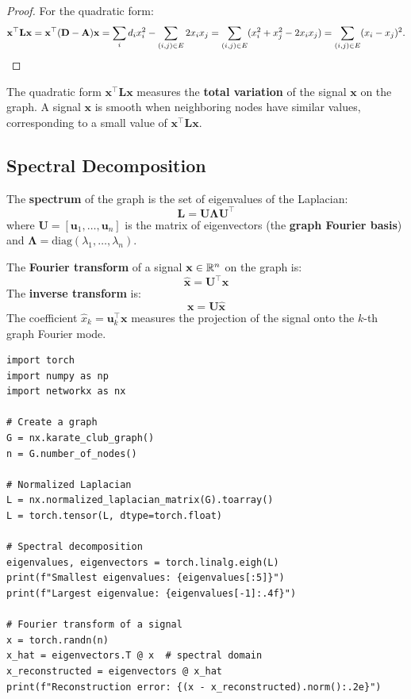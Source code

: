 \begin{proof}
For the quadratic form:
\[
    \mathbf{x}^\top \mathbf{L} \mathbf{x} = \mathbf{x}^\top (\mathbf{D} - \mathbf{A})\mathbf{x}
    = \sum_i d_i x_i^2 - \sum_{(i,j) \in E} 2x_i x_j
    = \sum_{(i,j) \in E} (x_i^2 + x_j^2 - 2x_i x_j)
    = \sum_{(i,j) \in E} (x_i - x_j)^2. \qedhere
\]
\end{proof}

\begin{intuition}[title=\textbf{The Laplacian as a smoothing operator}]
The quadratic form $\mathbf{x}^\top \mathbf{L} \mathbf{x}$ measures the
\textbf{total variation} of the signal $\mathbf{x}$ on the graph. A signal
$\mathbf{x}$ is smooth when neighboring nodes have similar values,
corresponding to a small value of $\mathbf{x}^\top \mathbf{L} \mathbf{x}$.
\end{intuition}

\subsection{Spectral Decomposition}

\begin{definition}
The \textbf{spectrum} of the graph is the set of eigenvalues of the Laplacian:
\[
    \mathbf{L} = \mathbf{U} \boldsymbol{\Lambda} \mathbf{U}^\top
\]
where $\mathbf{U} = [\mathbf{u}_1, \ldots, \mathbf{u}_n]$ is the matrix of
eigenvectors (the \textbf{graph Fourier basis}) and
$\boldsymbol{\Lambda} = \mathrm{diag}(\lambda_1, \ldots, \lambda_n)$.
\end{definition}

\begin{keyformulas}[title=\textbf{Graph Fourier Transform}]
The \textbf{Fourier transform} of a signal $\mathbf{x} \in \mathbb{R}^n$ on the
graph is:
\[
    \hat{\mathbf{x}} = \mathbf{U}^\top \mathbf{x}
\]
The \textbf{inverse transform} is:
\[
    \mathbf{x} = \mathbf{U} \hat{\mathbf{x}}
\]
The coefficient $\hat{x}_k = \mathbf{u}_k^\top \mathbf{x}$ measures the
projection of the signal onto the $k$-th graph Fourier mode.
\end{keyformulas}

\begin{codeblock}[title=\textbf{Spectral decomposition and Fourier transform}]
\begin{verbatim}
import torch
import numpy as np
import networkx as nx

# Create a graph
G = nx.karate_club_graph()
n = G.number_of_nodes()

# Normalized Laplacian
L = nx.normalized_laplacian_matrix(G).toarray()
L = torch.tensor(L, dtype=torch.float)

# Spectral decomposition
eigenvalues, eigenvectors = torch.linalg.eigh(L)
print(f"Smallest eigenvalues: {eigenvalues[:5]}")
print(f"Largest eigenvalue: {eigenvalues[-1]:.4f}")

# Fourier transform of a signal
x = torch.randn(n)
x_hat = eigenvectors.T @ x  # spectral domain
x_reconstructed = eigenvectors @ x_hat
print(f"Reconstruction error: {(x - x_reconstructed).norm():.2e}")
\end{verbatim}
\end{codeblock}

